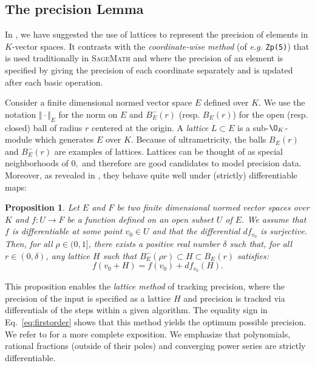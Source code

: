 \documentclass[sigconf]{acmart}
\newcommand{\sage}{\textsc{SageMath}\xspace}
\newtheorem{prop}[theo]{Proposition}
\theoremstyle{definition}
\begin{document}
\subsection{The precision Lemma}
\label{ssec:preclemma}

In \cite{caruso-roe-vaccon:14a}, we have suggested the 
use of lattices to represent the precision of elements in 
$K$-vector spaces.  It contrasts with the
\emph{coordinate-wise method} (of \textit{e.g.}
 \verb?Zp(5)?) that is used traditionally in \sage and
where the precision of an element is specified by giving the precision
of each coordinate separately and is updated after each basic
operation.

Consider a finite 
dimensional normed vector space $E$ 
defined over $K$. 
We use the notation $\Vert \cdot \Vert_E$ for the norm 
on $E$ and $B^-_E(r)$ (resp. $B^{\phantom -}_E(r)$) for the open (resp. 
closed) ball of radius $r$ centered at the origin. A \emph{lattice} $L \subset 
E$ is a sub-$\O_K$-module which generates $E$ over $K$. 
Because of ultrametricity, the balls $B^{\phantom 
-}_E(r)$ and $B^-_E(r)$ are examples of lattices. 
Lattices can be thought of as special neighborhoods of $0,$
 and therefore are good 
candidates to model precision data. Moreover, as revealed in 
\cite{caruso-roe-vaccon:14a}, they behave quite well under (strictly) 
differentiable maps:

\begin{prop}
\label{prop:precision}
Let $E$ and $F$ be two finite dimensional normed vector spaces over $K$ 
and $f : U \rightarrow F$ be a function defined on an open subset $U$ of 
$E$. We assume that $f$ is differentiable at some point $v_0 \in U$ and 
that the differential $df_{v_0}$ is surjective.
Then, for all $\rho \in (0, 1]$, there exists a positive real
number $\delta$ such that, for all $r \in (0, \delta)$, any lattice
$H$ such that $B^-_E(\rho r) \subset H \subset B^{\phantom -}_E(r)$ 
satisfies:
\begin{equation}
\label{eq:firstorder}
f(v_0 + H) = f(v_0) + df_{v_0} (H).
\end{equation}
\end{prop}

This proposition enables the \emph{lattice method} of tracking precision,
where the precision of the input is specified as a lattice $H$ and precision
is tracked via differentials of the steps within a given algorithm.
The equality sign in Eq.~\eqref{eq:firstorder} shows that this method
yields the optimum possible precision. 
We refer to \cite[\S 4.1]{caruso-roe-vaccon:14a} for a more complete 
exposition.
We emphasize that polynomials, rational fractions (outside of their poles)
and converging power series are strictly differentiable.
\end{document}
